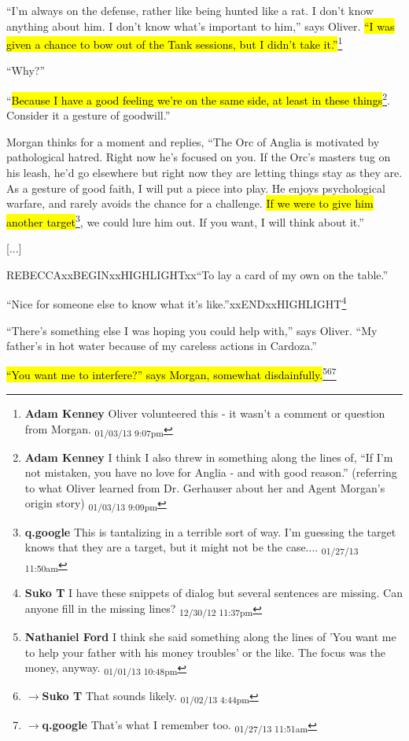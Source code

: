 ``I'm always on the defense, rather like being hunted like a rat.  I don't know anything about him.  I don't know what's important to him,'' says Oliver.  \hl{``I was given a chance to bow out of the Tank sessions, but I didn't take it.''}\footnote{\textbf{Adam Kenney }Oliver volunteered this - it wasn't a comment or question from Morgan. \textsubscript{01/03/13 9:07pm}}

``Why?''

``\hl{Because I have a good feeling we're on the same side, at least in these things}\footnote{\textbf{Adam Kenney }I think I also threw in something along the lines of, ``If I'm not mistaken, you have no love for Anglia - and with good reason.'' (referring to what Oliver learned from Dr. Gerhauser about her and Agent Morgan's origin story) \textsubscript{01/03/13 9:09pm}}.  Consider it a gesture of goodwill.''

Morgan thinks for a moment and replies, ``The Orc of Anglia is motivated by pathological hatred.  Right now he's focused on you.  If the Orc's masters tug on his leash, he'd go elsewhere but right now they are letting things stay as they are.  As a gesture of good faith, I will put a piece into play.  He enjoys psychological warfare, and rarely avoids the chance for a challenge.  \hl{If we were to give him another target}\footnote{\textbf{q.google }This is tantalizing in a terrible sort of way.  I'm guessing the target knows that they are a target, but it might not be the case.... \textsubscript{01/27/13 11:50am}}, we could lure him out.  If you want, I will think about it.''

{[}...{]}

REBECCAxxBEGINxxHIGHLIGHTxx``To lay a card of my own on the table.''

``Nice for someone else to know what it's like.''xxENDxxHIGHLIGHT\footnote{\textbf{Suko T }I have these snippets of dialog but several sentences are missing.  Can anyone fill in the missing lines? \textsubscript{12/30/12 11:37pm}}

``There's something else I was hoping you could help with,'' says Oliver.  ``My father's in hot water because of my careless actions in Cardoza.''

\hl{``You want me to interfere?'' says Morgan, somewhat disdainfully.}\footnote{\textbf{Nathaniel Ford }I think she said something along the lines of 'You want me to help your father with his money troubles' or the like. The focus was the money, anyway. \textsubscript{01/01/13 10:48pm}}\footnote{$\rightarrow$\textbf{Suko T }That sounds likely. \textsubscript{01/02/13 4:44pm}}\footnote{$\rightarrow$\textbf{q.google }That's what I remember too. \textsubscript{01/27/13 11:51am}}

